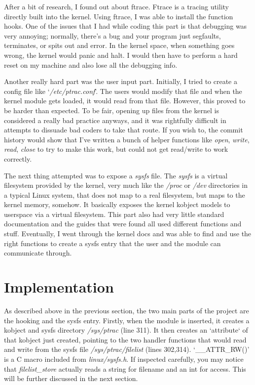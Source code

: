 \documentclass[letterpaper,12pt]{article}
\begin{document}
After a bit of research, I found out about ftrace. Ftrace is a tracing utility directly built into the kernel. Using ftrace, I was able to install the function hooks. One of the issues that I had while coding this part is that debugging was very annoying; normally, there's a bug and your program just segfaults, terminates, or spits out and error. In the kernel space, when something goes wrong, the kernel would panic and halt. I would then have to perform a hard reset on my machine and also lose all the debugging info.

Another really hard part was the user input part. Initially, I tried to create a config file like `\textit{/etc/ptrac.conf}'. The users would modify that file and when the kernel module gets loaded, it would read from that file. However, this proved to be harder than expected. To be fair, opening up files from the kernel is considered a really bad practice anyways, and it was rightfully difficult in attempts to dissuade bad coders to take that route. If you wish to, the commit history would show that I've written a bunch of helper functions like \textit{open}, \textit{write}, \textit{read}, \textit{close} to try to make this work, but could not get read/write to work correctly.

The next thing attempted was to expose a \textit{sysfs} file. The \textit{sysfs} is a virtual filesystem provided by the kernel, very much like the \textit{/proc} or \textit{/dev} directories in a typical Linux system, that does not map to a real filesystem, but maps to the kernel memory, somehow. It basically exposes the kernel kobject models to userspace via a virtual filesystem. This part also had very little standard documentation and the guides that were found all used different functions and stuff. Eventually, I went through the kernel docs and was able to find and use the right functions to create a sysfs entry that the user and the module can communicate through.

\section{Implementation}

As described above in the previous section, the two main parts of the project are the hooking and the sysfs entry. Firstly, when the module is inserted, it creates a kobject and sysfs directory \textit{/sys/ptrac} (line 311). It then creates an `attribute` of that kobject just created, pointing to the two handler functions that would read and write from the sysfs file \textit{/sys/ptrac/filelist} (lines 302,314). `\_\_ATTR\_RW()' is a C macro included from \textit{linux/sysfs.h}. If inspected carefully, you may notice that \textit{filelist\_store} actually reads a string for filename and an int for access. This will be further discussed in the next section.
\end{document}
